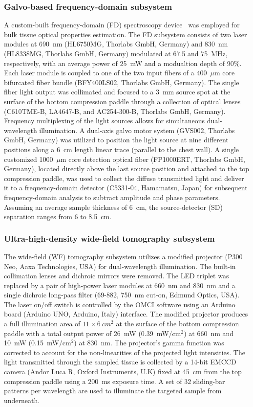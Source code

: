 \subsubsection{Galvo-based frequency-domain subsystem}
\label{sec:RF}
A custom-built frequency-domain (FD) spectroscopy device~\cite{Zimmermann2016} was employed for bulk tissue optical properties estimation. The FD subsystem consists of two laser modules at 690~nm (HL6750MG, Thorlabs GmbH, Germany) and 830~nm (HL8338MG, Thorlabs GmbH, Germany) modulated at 67.5 and 75~MHz, respectively, with an average power of 25~mW and a modualtion depth of 90\%. Each laser module is coupled to one of the two input fibers of a 400~$\mu$m core bifurcated fiber bundle (BFY400LS02, Thorlabs GmbH, Germany). The single fiber light output was collimated and focused to a 3~mm source spot at the surface of the bottom compression paddle through a collection of optical lenses (C610TME-B, LA4647-B, and AC254-300-B, Thorlabs GmbH, Germany). Frequency multiplexing of the light sources allows for simultaneous dual-wavelength illumination. A dual-axis galvo motor system (GVS002, Thorlabs GmbH, Germany) was utilized to position the light source at nine different positions along a 6~cm length linear trace (parallel to the chest wall). A single customized 1000~$\mu$m core detection optical fiber (FP1000ERT, Thorlabs GmbH, Germany), located directly above the last source position and attached to the top compression paddle, was used to collect the diffuse transmitted light and deliver it to a frequency-domain detector (C5331-04, Hamamatsu, Japan) for subsequent frequency-domain analysis to subtract amplitude and phase parameters. Assuming an average sample thickness of 6~cm, the source-detector (SD) separation ranges from 6 to 8.5~cm.

\subsubsection{Ultra-high-density wide-field tomography subsystem}
\label{sec:WF}
The wide-field (WF) tomography subsystem utilizes a modified projector (P300 Neo, Aaxa Technologies, USA) for dual-wavelength illumination. The built-in collimation lenses and dichroic mirrors were removed. The LED triplet was replaced by a pair of high-power laser modules at 660~nm and 830~nm and a single dichroic long-pass filter (69-882, 750~nm cut-on, Edmund Optics, USA). The laser on/off switch is controlled by the OMCI software using an Arduino board (Arduino UNO, Arduino, Italy) interface. The modified projector produces a full illumination area of $11\times6~cm^2$ at the surface of the bottom compression paddle with a total output power of 26~mW (0.39~mW/cm$^2$) at 660~nm and 10~mW (0.15~mW/cm$^2$) at 830~nm. The projector's gamma function was corrected to account for the non-linearities of the projected light intensities. The light transmitted through the sampled tissue is collected by a 14-bit EMCCD camera (Andor Luca R, Oxford Instruments, U.K) fixed at 45~cm from the top compression paddle using a 200~ms exposure time. A set of 32 sliding-bar patterns per wavelength are used to illuminate the targeted sample from underneath.

